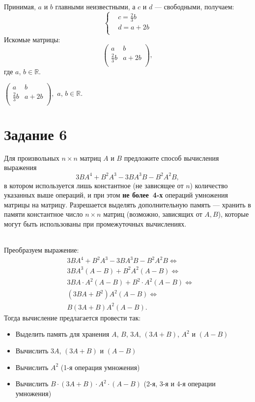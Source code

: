 \documentclass[a4paper,12pt]{article}
\begin{document}
Принимая, $a$ и $b$ главными неизвестными, а $c$ и $d$ --- свободными, получаем:
$$\left\{
\begin{aligned}
&c = \frac{2}{3}b\\
&d = a+2b\\
\end{aligned}
\right.
$$
Искомые матрицы:
$$ \begin{pmatrix}
a & b\\
\frac{2}{3}b & a+2b \\
\end{pmatrix},$$
где $a$, $b \in \mathbb{R}.$ \par
{}
$ \begin{pmatrix}
a & b\\
\frac{2}{3}b & a+2b \\
\end{pmatrix},$
$a$, $b \in \mathbb{R}.$
\newpage
\section*{Задание 6}
Для произвольных $n \times n$ матриц $A$ и $B$ предложите способ вычисления выражения
$$3BA^4 + B^2A^3 - 3BA^3B - B^2A^2B,$$
в котором используется лишь константное (не зависящее от $n$) количество указанных выше операций, и при этом {\bf не более~4-х} операций умножения матрицы на матрицу. Разрешается выделять дополнительную память --- хранить в памяти константное число $n \times n$ матриц (возможно, зависящих от $A, B$), которые могут быть использованы при промежуточных вычислениях.\par
{}\\
Преобразуем выражение:
\begin{align*}
&3BA^4 + B^2A^3 - 3BA^3B - B^2A^2B \Leftrightarrow \\
&3BA^3(A-B) + B^2A^2(A-B) \Leftrightarrow \\
&3BA \cdot A^2(A-B) + B^2 \cdot A^2(A-B) \Leftrightarrow \\
&(3BA+B^2)A^2(A-B) \Leftrightarrow \\
&B(3A+B)A^2(A-B).
\end{align*}
Тогда вычисление предлагается провести так: 
\begin{itemize}
\item Выделить память для хранения $A$, $B$, $3A$, $(3A+B)$, $A^2$ и $(A-B)$
\item Вычислить $3A$, $(3A+B)$ и $(A-B)$
\item Вычислить $A^2$ (1-я операция умножения)
\item Вычислить $B\cdot (3A+B)\cdot A^2 \cdot (A-B)$ (2-я, 3-я и 4-я операции умножения)
\end{itemize} 
\newpage
\end{document}
